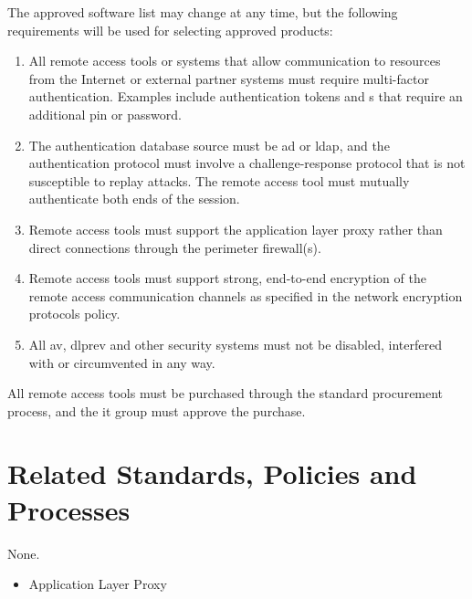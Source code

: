The approved software list may change at any time, but the following requirements will be used for selecting approved products:
\begin{enumerate}
\item
All remote access tools or systems that allow communication to \CompanyName{} resources from the Internet or external partner systems must require multi-factor authentication.  
Examples include authentication tokens and \smartcard{}s that require an additional \gls{pin} or password.
\item
The authentication database source must be \gls{ad} or \gls{ldap}, and the authentication protocol must involve a challenge-response protocol that is not susceptible to replay attacks.  
The remote access tool must mutually authenticate both ends of the session.
\item
Remote access tools must support the \CompanyName{} application layer proxy rather than direct connections through the perimeter firewall(s).
\item
Remote access tools must support strong, end-to-end encryption of the remote access communication channels as specified in the \CompanyName{} network encryption protocols policy.
\item
All \CompanyName{} \gls{av}, \gls{dlprev}\oxford{} and other security systems must not be disabled, interfered with\oxford{} or circumvented in any way.
\end{enumerate}

All remote access tools must be purchased through the standard \CompanyName{} procurement process, and the \gls{it} group must approve the purchase.
\CommonPolicyCompliance
\section{Related Standards, Policies\oxford{} and Processes}
None.
\CommonDefinitionsAndTerms
\begin{itemize}
\item Application Layer Proxy
\end{itemize}
\CommonRevisionHistory